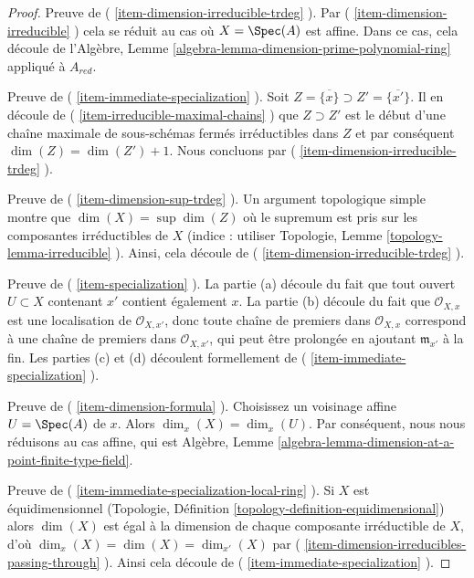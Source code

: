 \begin{proof}
\medskip\noindent
Preuve de ( \ref{item-dimension-irreducible-trdeg} ).
Par ( \ref{item-dimension-irreducible} ) cela se
réduit au cas où $X = \Spec(A)$ est affine. Dans ce
cas, cela découle de l'Algèbre, Lemme
\ref{algebra-lemma-dimension-prime-polynomial-ring} appliqué à $A_{red}$.

\medskip\noindent
Preuve de ( \ref{item-immediate-specialization} ).
Soit $Z = \overline{\{x\}} \supset Z' =
\overline{\{x'\}}$. Il en découle de (
\ref{item-irreducible-maximal-chains} ) que $Z \supset Z'$
est le début d'une chaîne maximale de sous-schémas fermés
irréductibles dans $Z$ et par conséquent $\dim(Z) = \dim(Z') +
1$. Nous concluons par ( \ref{item-dimension-irreducible-trdeg} ).

\medskip\noindent
Preuve de ( \ref{item-dimension-sup-trdeg} ). Un argument
topologique simple montre que $\dim(X) = \sup \dim(Z)$ où le
supremum est pris sur les composantes irréductibles de $X$ (indice
: utiliser Topologie, Lemme \ref{topology-lemma-irreducible} ).
Ainsi, cela découle de ( \ref{item-dimension-irreducible-trdeg} ).

\medskip\noindent
Preuve de ( \ref{item-specialization} ). La partie (a) découle du fait
que tout ouvert $U \subset X$ contenant $x'$ contient également $x$. La
partie (b) découle du fait que $\mathcal{O}_{X, x}$ est une localisation
de $\mathcal{O}_{X, x'}$, donc toute chaîne de premiers dans
$\mathcal{O}_{X, x}$ correspond à une chaîne de premiers dans $\mathcal{O}_{X,
x'}$, qui peut être prolongée en ajoutant $\mathfrak m_{x'}$ à la fin. Les
parties (c) et (d) découlent formellement de ( \ref{item-immediate-specialization} ).

\medskip\noindent
Preuve de ( \ref{item-dimension-formula} ). Choisissez un
voisinage affine $U = \Spec(A)$ de $x$. Alors $\dim_x(X) =
\dim_x(U)$. Par conséquent, nous nous réduisons au cas affine, qui est
Algèbre, Lemme \ref{algebra-lemma-dimension-at-a-point-finite-type-field}.

\medskip\noindent
Preuve de (
\ref{item-immediate-specialization-local-ring} ). Si $X$ est
équidimensionnel (Topologie, Définition
\ref{topology-definition-equidimensional}) alors $\dim(X)$ est égal à la
dimension de chaque composante irréductible de $X$, d'où $\dim_x(X) =
\dim(X) = \dim_{x'}(X)$ par (
\ref{item-dimension-irreducibles-passing-through} ). Ainsi cela découle de ( \ref{item-immediate-specialization} ).
\end{proof}

